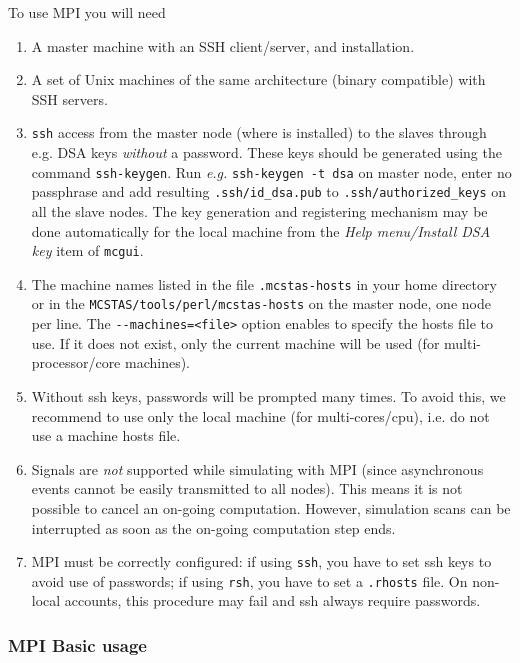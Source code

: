To use MPI you will need
  \begin{enumerate}
  \item{A master machine with an SSH client/server, and \MCS installation.}
  \item{A set of Unix machines of the same architecture (binary compatible) with
      SSH servers.}
  \item{ \texttt{ssh} access from the master node (where \MCS is
      installed) to the slaves through e.g. DSA keys \emph{without} a
      password. These keys should be generated using the command
      \texttt{ssh-keygen}. Run \emph{e.g.} \texttt{ssh-keygen -t dsa} on
      master node, enter no passphrase and add resulting
      \texttt{.ssh/id\_dsa.pub} to \texttt{.ssh/authorized\_keys}
      on all the slave nodes. The key generation and registering mechanism
      may be done automatically for the local machine from the
      \emph{Help menu/Install DSA key} item of \verb+mcgui+.}
  \item{
      The machine names listed in the file \texttt{.mcstas-hosts} in
      your home directory or in the \texttt{MCSTAS/tools/perl/mcstas-hosts} on
      the master node, one node per line. The \verb'--machines=<file>' option
      enables to specify the hosts file to use. If it does not exist, only
      the current machine will be used (for multi-processor/core machines).}
  \item{Without ssh keys, passwords will be prompted many times. To avoid this,
      we recommend to use only the local machine (for multi-cores/cpu), i.e. do
      not use a machine hosts file.}
  \item Signals are \emph{not} supported while simulating with MPI (since
    asynchronous events cannot be easily transmitted to all nodes). This
    means it is not possible to cancel an on-going computation. However,
    simulation scans can be interrupted as soon as the on-going computation
    step ends.
  \item MPI must be correctly configured: if using \verb'ssh', you
    have to set ssh keys to avoid use of passwords; if
    using \verb'rsh', you have to set a \verb'.rhosts' file.
    On non-local accounts, this procedure may fail and ssh always require passwords.
  \end{enumerate}

\subsubsection{MPI Basic usage}

